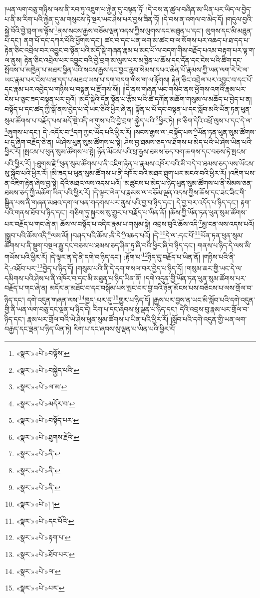 །ཡན་ལག་བཅུ་གཉིས་ལས་ནི་རབ་ཏུ་འཇུག་པ་རྐྱེན་དུ་བསྟན་ཏོ། །དེ་བས་ན་ཚུལ་བཞིན་མ་ཡིན་པར་ཡིད་ལ་བྱེད་པ་ནི་མ་རིག་པའི་རྐྱེན་དུ་མ་གསུངས་ཏེ་སྔར་ཡང་ཤེས་པར་བྱས་ཟིན་ཏོ། །དེ་བས་ན་འགལ་བ་མེད་དོ། །གདུལ་བྱའི་སྐྱེ་བོའི་བྱེ་བྲག་ལ་ལྟོས་\footnote{«སྣར་»«པེ་»བལྟོས་}ནས་སངས་རྒྱས་བཅོམ་ལྡན་འདས་ཀྱིས་ལུགས་དང་མཐུན་པ་དང་། ལུགས་དང་མི་མཐུན་པ་དང་། ནག་པོ་དང་དཀར་པོའི་ཕྱོགས་དང་། ཚང་བ་དང་ཡན་ལག་མ་ཚང་བ་ལ་སོགས་པར་འཆད་པ་ཐ་དད་པ་རྟེན་ཅིང་འབྲེལ་བར་འབྱུང་བ་སྟོན་པའི་མདོ་སྡེ་གཞན་རྣམ་པ་མང་པོ་ལ་བདག་གིས་བརྗོད་པའམ་བརྟག་པར་ལྟ་ག་ལ་ནུས། རྟེན་ཅིང་འབྲེལ་པར་འབྱུང་བའི་བྱེ་བྲག་མ་ལུས་པར་མཁྱེན་པ་ཆོས་དང་དོན་དང་ངེས་པའི་ཚིག་དང་སྤོབས་པ་མཁྱེན་པ་མཐར་ཕྱིན་པའི་སངས་རྒྱས་དང་བྱང་ཆུབ་སེམས་དཔའ་ཆེན་པོ་རྣམས་ཀྱི་ཡན་ལག་རེ་རེ་ལ་ཡང་རྣམ་པར་ངེས་པ་ཐ་དད་པ་མཐའ་ཡས་པ་དག་བདག་གིས་ག་ལ་རྟོགས། རྟེན་ཅིང་འབྲེལ་པར་འབྱུང་བ་དང་པོ་དང་རྣམ་པར་འབྱེད་པ་གཉིས་པ་བསྟན་པ་རྫོགས་སོ།། །།དེ་ནས་གཞན་ཡང་གསེབ་ནས་ཕྱོགས་འགའི་རྣམ་པར་ངེས་པ་ཅུང་ཟད་བསྟན་པར་བྱའོ། །མདོ་སྡེའི་དོན་སྟོན་པ་རྩོམ་པའི་ཚེ་དཀོན་མཆོག་གསུམ་ལ་མཆོད་པ་བྱེད་པ་ན། བསྟོད་པ་དང་ཚད་ཀྱི་སྒོ་ནས་བྱེད་པ་དེ་ཡང་ཅིའི་ཕྱིར་ཞེ་ན། སྟོན་པ་པོ་དང་བསྟན་པ་དང་སློབ་མའི་ཡོན་ཏན་ཕུན་སུམ་ཚོགས་པ་བརྗོད་པས་མདོ་སྡེ་འདི་ལ་གུས་པའི་བྱེ་བྲག་:སྐྱེད་པའི་\footnote{«སྣར་»«པེ་»བསྐྱེད་པའི་}ཕྱིར་ཏེ། ཁ་ཅིག་དེའི་འཕྲོ་ལུས་པ་དང་དེ་ལ་\footnote{«སྣར་»«པེ་»ལ་མ་}ཞུགས་པ་དང་། དེ་:འདོར་བ་\footnote{«སྣར་»«པེ་»མདོར་བ་}དག་ཀྱང་ཡོད་པའི་ཕྱིར་རོ། །སངས་རྒྱས་ལ་:བསྟོད་པས་\footnote{«སྣར་»«པེ་»བསྟོད་པར་}ཡོན་ཏན་ཕུན་སུམ་ཚོགས་པ་དུ་ཞིག་བརྗོད་ཅེ་ན། ཡེ་ཤེས་ཕུན་སུམ་ཚོགས་པ་སྟེ། ཤེས་བྱ་ཐམས་ཅད་ལ་ཐོགས་པ་མེད་པའི་ཡེ་ཤེས་ཡིན་པའི་ཕྱིར་རོ། །སྤངས་པ་ཕུན་སུམ་ཚོགས་པ་སྟེ། ཉོན་མོངས་པའི་ཕྲ་རྒྱས་ཐམས་ཅད་བག་ཆགས་དང་བཅས་ཏེ་སྤངས་པའི་ཕྱིར་རོ། །:ཐུགས་རྗེ་\footnote{«སྣར་»«པེ་»ཐུགས་རྗེའི་}ཕུན་སུམ་ཚོགས་པ་ནི་འཇིག་རྟེན་པ་རྣམས་འཁོར་བའི་མི་བདེ་བ་ཐམས་ཅད་ལས་ཡོངས་སུ་སྐྱོབ་པའི་ཕྱིར་རོ། །མི་ཟད་པ་ཕུན་སུམ་ཚོགས་པ་ནི་འཁོར་བའི་མཐར་ཐུག་པར་མངའ་བའི་ཕྱིར་རོ། །འཇིག་པས་ན་འཇིག་རྟེན་ཞེས་བྱ་སྟེ། དེའི་མཐའ་ལས་འདས་པའོ། །མཚུངས་པ་མེད་པ་ཉིད་ཕུན་སུམ་ཚོགས་པ་ནི་སེམས་ཅན་ཐམས་ཅད་ཀྱི་མཆོག་ཡིན་པའི་ཕྱིར་རོ། །དེ་ལྟར་ལེན་པ་རྣམས་ལ་བཅོམ་ལྡན་འདས་ཀྱིས་ཆོས་དང་ཟང་ཟིང་གི་སྦྱིན་པས་ནི་གཞན་མཐའ་དག་ལ་ཕན་གདགས་པར་ནུས་པའི་བྱ་བ་ཉིད་དང་། དེ་བྱ་བར་འདོད་པ་ཉིད་དང་། རྟག་པའི་གནས་ཐོབ་པ་ཉིད་དང་། གཅིག་ཏུ་སྐྱབས་སུ་གྱུར་པ་བརྗོད་པ་ཡིན་ནོ། །ཆོས་ཀྱི་ཡོན་ཏན་ཕུན་སུམ་ཚོགས་པར་བརྗོད་པ་གང་ཞེ་ན། ཆོས་ལ་བསྟོད་པ་འདིར་རྣམ་པ་གསུམ་སྟེ། འབྲས་བུའི་ཆོས་འདི་\footnote{«སྣར་»«པེ་»ནི་}མྱ་ངན་ལས་འདས་པའོ། །སྒྲུབ་པའི་ཆོས་འདི་\footnote{«སྣར་»«པེ་»ནི་}ལམ་མོ། །བཤད་པའི་ཆོས་:ནི་དེ་\footnote{«སྣར་»«པེ་»ནི་}འཆད་པའོ། །དེ་\footnote{«སྣར་»«པེ་»། །}དེ་ལ་:དང་པོ་\footnote{«སྣར་»«པེ་»དང་པོའི་}ཡོན་ཏན་ཕུན་སུམ་ཚོགས་པ་ནི་སྡུག་བསྔལ་རྒྱུ་དང་བཅས་པ་ཐམས་ཅད་ཤིན་ཏུ་ཞི་བའི་ཕྱིར་ཞི་བ་ཉིད་དང་། གནས་པ་ཉིད་དེ་ལས་མི་གཡོས་པའི་ཕྱིར་རོ། །དེ་ལྟར་ན་དེ་ནི་དགེ་བ་ཉིད་དང་། :རྟོག་པ་\footnote{«སྣར་»«པེ་»རྟག་པ་}ཉིད་དུ་བརྗོད་པ་ཡིན་ནོ། །གཉིས་པའི་ནི་དེ་:འཐོབ་པར་\footnote{«སྣར་»«པེ་»ཐོབ་པར་}བྱེད་པ་ཉིད་དོ། །གསུམ་པའི་ནི་དེ་དག་གསལ་བར་བྱེད་པ་ཉིད་དོ། །གསུམ་ཆར་གྱི་ཡང་དེ་ལ་དམིགས་པའི་ཤེས་པ་ནི་འཁོར་བ་དང་མི་མཐུན་པ་ཉིད་ཡིན་ནོ། །དགེ་འདུན་གྱི་ཡོན་ཏན་ཕུན་སུམ་ཚོགས་པར་བརྗོད་པ་གང་ཞེ་ན། མདོར་ན་མཐོང་བ་དང་བསྒོམ་པས་སྤང་བར་བྱ་བའི་ཉོན་མོངས་པས་བཅིངས་པ་ལས་གྲོལ་བ་ཉིད་དང་། དགེ་འདུན་གཞན་ལས་\footnote{«སྣར་»«པེ་»ལ་}ཁྱད་:པར་དུ་\footnote{«སྣར་»«པེ་»པར་}གྱུར་པ་ཉིད་དོ། །རྒྱས་པར་བྱས་ན་ཡང་མི་སློབ་པའི་དགེ་འདུན་གྱི་ནི་ཡན་ལག་བཅུ་དང་ལྡན་པ་ཉིད་དེ། རིག་པ་དང་ཞབས་སུ་ལྡན་པ་ཉིད་དང་། དེའི་འབྲས་བུ་རྣམ་པར་གྲོལ་བ་ཉིད་དང་། རྣམ་པར་གྲོལ་བའི་ཡེ་ཤེས་ཕུན་སུམ་ཚོགས་པ་ཡིན་པའི་ཕྱིར་རོ། །སློབ་པའི་དགེ་འདུན་གྱི་ཡན་ལག་བརྒྱད་དང་ལྡན་པ་ཉིད་ཡིན་ཏེ། རིག་པ་དང་ཞབས་སུ་ལྡན་པ་ཡིན་པའི་ཕྱིར་རོ། 